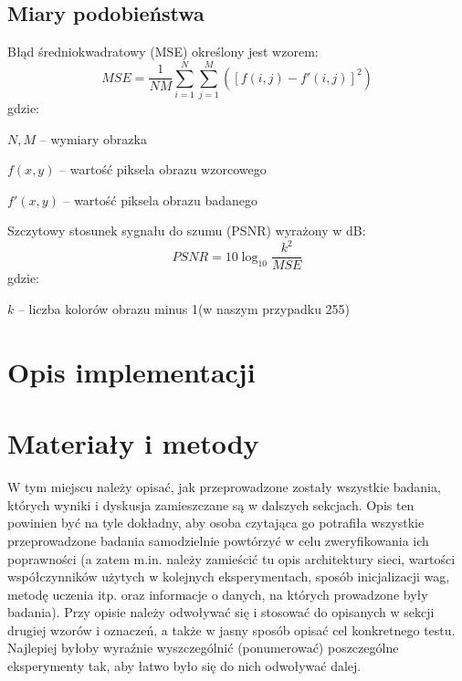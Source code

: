 \documentclass{classrep}
\begin{document}
\subsection{Miary podobieństwa}
Błąd średniokwadratowy (MSE) określony jest wzorem:
\begin{equation}
 MSE = \frac{1}{N M}\sum\limits_{i=1}^N \sum\limits_{j=1}^M ([f(i,j)-f'(i,j)]^2) 
\end{equation}
gdzie:
\begin{description}
 \item $N,M$ -- wymiary obrazka
 \item $f(x,y)$ -- wartość piksela obrazu wzorcowego
 \item $f'(x,y)$ -- wartość piksela obrazu badanego
\end{description}

Szczytowy stosunek sygnału do szumu (PSNR) wyrażony w dB:
\begin{equation}
 PSNR = 10 \log_{10}\frac{k^2}{MSE}
\end{equation}
gdzie:
\begin{description}
 \item $k$ -- liczba kolorów obrazu minus 1(w naszym przypadku 255)
\end{description}


\section{Opis implementacji}


\section{Materiały i metody}
W tym miejscu należy opisać, jak przeprowadzone zostały wszystkie badania,
których wyniki i dyskusja zamieszczane są w dalszych sekcjach. Opis ten
powinien być na tyle dokładny, aby osoba czytająca go potrafiła wszystkie
przeprowadzone badania samodzielnie powtórzyć w celu zweryfikowania ich
poprawności (a zatem m.in. należy zamieścić tu opis architektury sieci,
wartości współczynników użytych w kolejnych eksperymentach, sposób
inicjalizacji wag, metodę uczenia itp. oraz informacje o danych, na których
prowadzone były badania). Przy opisie należy odwoływać się i stosować do
opisanych w sekcji drugiej wzorów i oznaczeń, a także w jasny sposób opisać
cel konkretnego testu. Najlepiej byłoby wyraźnie wyszczególnić (ponumerować)
poszczególne eksperymenty tak, aby łatwo było się do nich odwoływać dalej.
\end{document}
